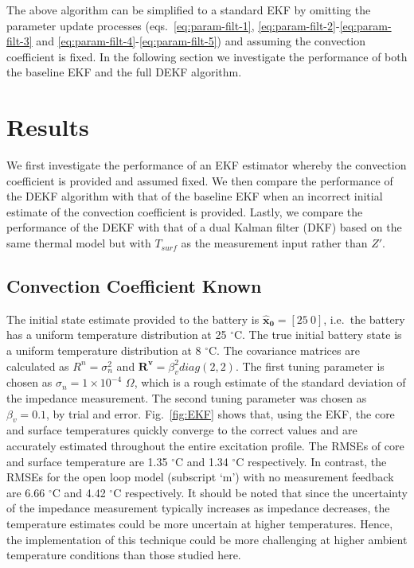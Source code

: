 \documentclass[journal, english]{IEEEtran}
\begin{document}
The above algorithm can be simplified to a standard EKF by omitting the parameter update processes (eqs.\ \ref{eq:param-filt-1}, \ref{eq:param-filt-2}-\ref{eq:param-filt-3} and \ref{eq:param-filt-4}-\ref{eq:param-filt-5}) and assuming the convection coefficient is fixed. In the following section we investigate the performance of both the baseline EKF and the full DEKF algorithm.

\section{Results}
We first investigate the performance of an EKF estimator
whereby the convection coefficient is provided and assumed fixed.
We then compare the performance of the DEKF algorithm with that of
the baseline EKF when an incorrect initial estimate of the convection
coefficient is provided. Lastly, we compare the performance of the
DEKF with that of a dual Kalman filter (DKF) based on the same thermal model but with
 $T_{surf}$ as the measurement input rather than $Z'$.

\subsection{Convection Coefficient Known\label{sub:Convection-Coefficient-Provided}}
The initial state estimate provided to the battery is $\mathbf{\hat{x}_0}=[25\:0]$,
i.e.\ the battery has a uniform temperature distribution at 25 $^{\circ}$C.
The true initial battery state is a uniform temperature distribution
at 8 $^{\circ}$C. The covariance matrices are calculated as $R^{n}=\sigma_{n}^{2}$
and $\mathbf{R}^{\mathbf{v}}=\beta_{v}^{2}diag(2,2)$.
The first tuning parameter is chosen as $\sigma_{n}=1\times10^{-4}$ $\Omega$, which is a rough estimate of the standard deviation of the impedance measurement. The second tuning parameter was chosen as $\beta_{v}=0.1$, by trial and error.
Fig.\ \ref{fig:EKF}
shows that, using the EKF, the core and surface temperatures quickly
converge to the correct values and are accurately estimated throughout
the entire excitation profile. The RMSEs of core and surface temperature
are 1.35 $^{\circ}$C and 1.34 $^{\circ}$C respectively. In contrast,
the RMSEs for the open loop model (subscript `m') with no measurement feedback are
6.66 $^{\circ}$C and 4.42 $^{\circ}$C respectively.
It should be noted that since the uncertainty of the impedance measurement typically increases as impedance decreases, the temperature estimates could be more uncertain at higher temperatures. Hence, the implementation of this technique could be more challenging at higher ambient temperature conditions than those studied here.
\end{document}
